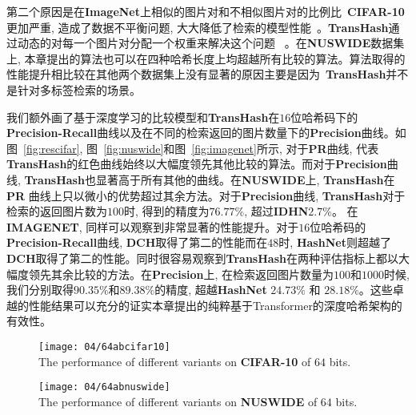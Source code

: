 第二个原因是在\textbf{ImageNet}上相似的图片对和不相似图片对的比例比~\textbf{CIFAR-10}更加严重, 造成了数据不平衡问题, 大大降低了检索的模型性能~\cite{zhang2019improved,liu2016deep12}。\textbf{TransHash}通过动态的对每一个图片对分配一个权重来解决这个问题~ \cite{cao2017hashnet}。在\textbf{NUSWIDE}数据集上, 本章提出的算法也可以在四种哈希长度上均超越所有比较的算法。算法取得的性能提升相比较在其他两个数据集上没有显著的原因主要是因为~\textbf{TransHash}并不是针对多标签检索的场景。\par
我们额外画了基于深度学习的比较模型和\textbf{TransHash}在$16$位哈希码下的\textbf{Precision-Recall}曲线以及在不同的检索返回的图片数量下的\textbf{Precision}曲线。如图~\ref{fig:rescifar}, 图~\ref{fig:nuswide}和图~\ref{fig:imagenet}所示, 对于\textbf{PR}曲线, 代表\textbf{TransHash}的红色曲线始终以大幅度领先其他比较的算法。而对于\textbf{Precision}曲线, \textbf{TransHash}也显著高于所有其他的曲线。在\textbf{NUSWIDE}上, \textbf{TransHash}在\textbf{PR} 曲线上只以微小的优势超过其余方法。对于\textbf{Precision}曲线, \textbf{TransHash}对于检索的返回图片数为$100$时, 得到的精度为$76.77 \%$, 超过\textbf{IDHN}$2.7 \%$。 在\textbf{IMAGENET}, 同样可以观察到非常显著的性能提升。对于$16$位哈希码的\textbf{Precision-Recall}曲线, \textbf{DCH}取得了第二的性能而在$48$时, \textbf{HashNet}则超越了\textbf{DCH}取得了第二的性能。同时很容易观察到\textbf{TransHash}在两种评估指标上都以大幅度领先其余比较的方法。在\textbf{Precision}上, 在检索返回图片数量为$100$和$1000$时候, 我们分别取得$90.35\%$和$ 89.38\%$的精度, 超越\textbf{HashNet} $24.73\%$ 和 $28.18 \%$。这些卓越的性能结果可以充分的证实本章提出的纯粹基于Transformer的深度哈希架构的有效性。
\begin{figure}[!htp]
    \centering
    \texttt{[image: 04/64abcifar10]} \\
      {The performance of different variants on \textbf{CIFAR-10} of $64$ bits.}
   \label{fig:ablationcifar}
\end{figure}

\begin{figure}[!htp]
    \centering
    \texttt{[image: 04/64abnuswide]} \\
      {The performance of different variants on \textbf{NUSWIDE} of $64$ bits.}
   \label{fig:ablationnuswide}
\end{figure}


